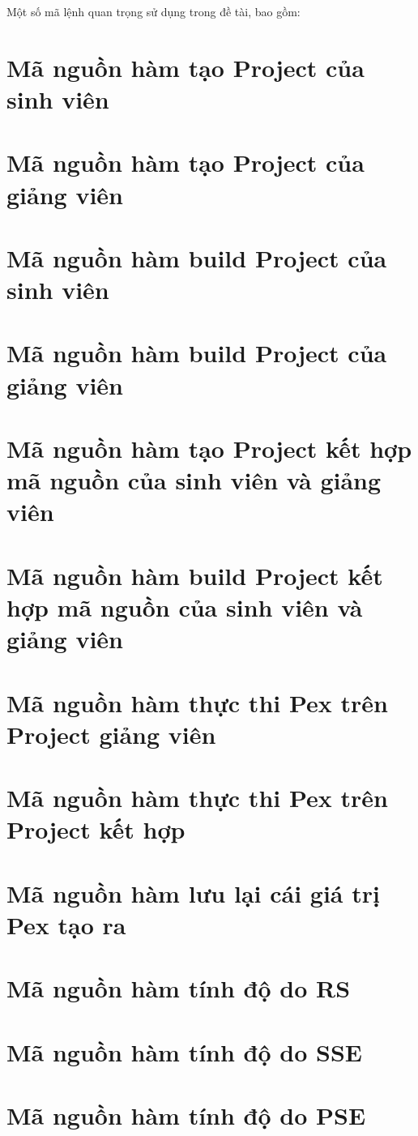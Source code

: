 Một số mã lệnh quan trọng sử dụng trong đề tài, bao gồm:

\section*{Mã nguồn hàm tạo Project của sinh viên}


\section*{Mã nguồn hàm tạo Project của giảng viên}


\section*{Mã nguồn hàm build Project của sinh viên}


\section*{Mã nguồn hàm build Project của giảng viên}


\section*{Mã nguồn hàm tạo Project kết hợp mã nguồn của sinh viên và giảng viên}


\section*{Mã nguồn hàm build Project kết hợp mã nguồn của sinh viên và giảng viên}


\section*{Mã nguồn hàm thực thi Pex trên Project giảng viên}


\section*{Mã nguồn hàm thực thi Pex trên Project kết hợp}


\section*{Mã nguồn hàm lưu lại cái giá trị Pex tạo ra}


\section*{Mã nguồn hàm tính độ do RS}


\section*{Mã nguồn hàm tính độ do SSE}


\section*{Mã nguồn hàm tính độ do PSE}
